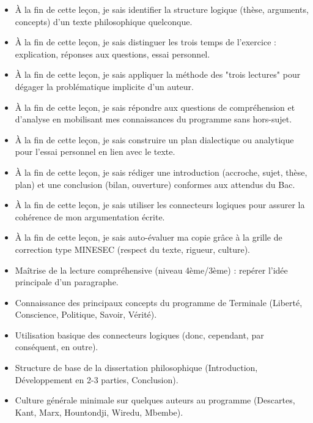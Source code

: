\documentclass[11pt]{article}
\begin{document}
\begin{objectifs}
\begin{itemize}
\item À la fin de cette leçon, je sais identifier la structure logique (thèse, arguments, concepts) d'un texte philosophique quelconque.
\item À la fin de cette leçon, je sais distinguer les trois temps de l'exercice : explication, réponses aux questions, essai personnel.
\item À la fin de cette leçon, je sais appliquer la méthode des "trois lectures" pour dégager la problématique implicite d'un auteur.
\item À la fin de cette leçon, je sais répondre aux questions de compréhension et d'analyse en mobilisant mes connaissances du programme sans hors-sujet.
\item À la fin de cette leçon, je sais construire un plan dialectique ou analytique pour l'essai personnel en lien avec le texte.
\item À la fin de cette leçon, je sais rédiger une introduction (accroche, sujet, thèse, plan) et une conclusion (bilan, ouverture) conformes aux attendus du Bac.
\item À la fin de cette leçon, je sais utiliser les connecteurs logiques pour assurer la cohérence de mon argumentation écrite.
\item À la fin de cette leçon, je sais auto-évaluer ma copie grâce à la grille de correction type MINESEC (respect du texte, rigueur, culture).
\end{itemize}
\end{objectifs}

\begin{prerequis}
\begin{itemize}
\item Maîtrise de la lecture compréhensive (niveau 4ème/3ème) : repérer l'idée principale d'un paragraphe.
\item Connaissance des principaux concepts du programme de Terminale (Liberté, Conscience, Politique, Savoir, Vérité).
\item Utilisation basique des connecteurs logiques (donc, cependant, par conséquent, en outre).
\item Structure de base de la dissertation philosophique (Introduction, Développement en 2-3 parties, Conclusion).
\item Culture générale minimale sur quelques auteurs au programme (Descartes, Kant, Marx, Hountondji, Wiredu, Mbembe).
\end{itemize}
\end{prerequis}
\end{document}
